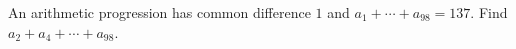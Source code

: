 An arithmetic progression has common difference $1$ and $a_1+\cdots+a_{98}=137$. Find $a_2+a_4+\cdots+a_{98}$.
